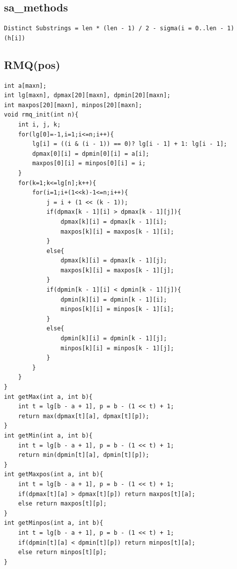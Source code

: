 \documentclass[twocolumn]{article}
\begin{document}
\begin{twocolumn}
\subsection{sa\_methods}
\begin{lstlisting}[language={[ANSI]C}]
Distinct Substrings = len * (len - 1) / 2 - sigma(i = 0..len - 1)(h[i])
\end{lstlisting}
\subsection{RMQ(pos)}
\begin{lstlisting}[language={[ANSI]C}]
int a[maxn];
int lg[maxn], dpmax[20][maxn], dpmin[20][maxn];
int maxpos[20][maxn], minpos[20][maxn];
void rmq_init(int n){
    int i, j, k;
    for(lg[0]=-1,i=1;i<=n;i++){
        lg[i] = ((i & (i - 1)) == 0)? lg[i - 1] + 1: lg[i - 1];
        dpmax[0][i] = dpmin[0][i] = a[i];
        maxpos[0][i] = minpos[0][i] = i;
    }
    for(k=1;k<=lg[n];k++){
        for(i=1;i+(1<<k)-1<=n;i++){
            j = i + (1 << (k - 1));
            if(dpmax[k - 1][i] > dpmax[k - 1][j]){
                dpmax[k][i] = dpmax[k - 1][i];
                maxpos[k][i] = maxpos[k - 1][i];
            }
            else{
                dpmax[k][i] = dpmax[k - 1][j];
                maxpos[k][i] = maxpos[k - 1][j];
            }
            if(dpmin[k - 1][i] < dpmin[k - 1][j]){
                dpmin[k][i] = dpmin[k - 1][i];
                minpos[k][i] = minpos[k - 1][i];
            }
            else{
                dpmin[k][i] = dpmin[k - 1][j];
                minpos[k][i] = minpos[k - 1][j];
            }
        }
    }
}
int getMax(int a, int b){
    int t = lg[b - a + 1], p = b - (1 << t) + 1;
    return max(dpmax[t][a], dpmax[t][p]);
}
int getMin(int a, int b){
    int t = lg[b - a + 1], p = b - (1 << t) + 1;
    return min(dpmin[t][a], dpmin[t][p]);
}
int getMaxpos(int a, int b){
    int t = lg[b - a + 1], p = b - (1 << t) + 1;
    if(dpmax[t][a] > dpmax[t][p]) return maxpos[t][a];
    else return maxpos[t][p];
}
int getMinpos(int a, int b){
    int t = lg[b - a + 1], p = b - (1 << t) + 1;
    if(dpmin[t][a] < dpmin[t][p]) return minpos[t][a];
    else return minpos[t][p];
}
\end{lstlisting}


\end{twocolumn}
\end{document}

